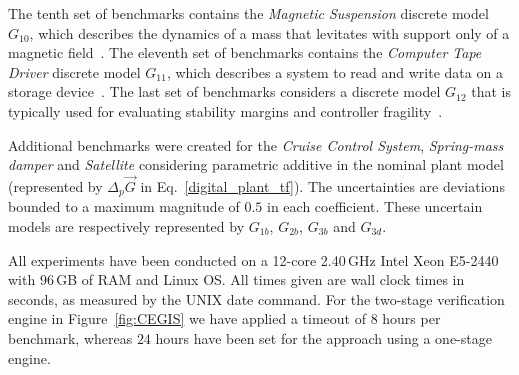 \documentclass[final]{sig-alternate-05-2015}
\begin{document}
%
The tenth set of benchmarks contains the \textit{Magnetic Suspension}
discrete model $G_{10}$, which describes the dynamics of a mass that
levitates with support only of a magnetic field~\cite{Franklin15}.
%
%
%
The eleventh set of benchmarks contains the \textit{Computer Tape Driver}
discrete model $G_{11}$, which describes a system to read and write data
on a storage device~\cite{Franklin15}.
%
%
The last set of benchmarks considers a discrete model $G_{12}$ that is
typically used for evaluating stability margins and controller
fragility~\cite{bhattacharyya97, keel_Bhattacharyya_examples}.

Additional benchmarks were created for the \textit{Cruise Control System},
\textit{Spring-mass damper} and \textit{Satellite} considering parametric
additive in the nominal plant model (represented by $\Delta_{p}\vec{G}$ in
Eq.~\eqref{digital_plant_tf}).  The uncertainties are deviations bounded to
a maximum magnitude of $0.5$ in each coefficient.  These uncertain models
are respectively represented by $G_{1b}$, $G_{2b}$, $G_{3b}$ and
$G_{3d}$.

All experiments have been conducted on a 12-core 2.40\,GHz Intel Xeon
E5-2440 with 96\,GB of RAM and Linux OS.  All times given are wall clock
times in seconds, as measured by the UNIX date command.  For the two-stage
verification engine in Figure~\ref{fig:CEGIS} we have applied a timeout of
$8$ hours per benchmark, whereas $24$ hours have been set for the approach
using a one-stage engine.
\end{document}
